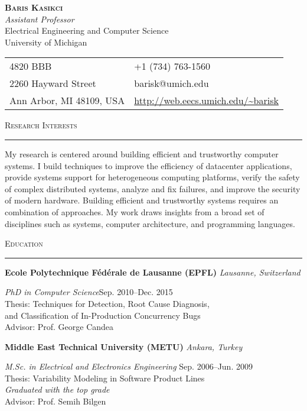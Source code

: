\documentclass[10pt]{article}
\newcommand{\mysec}[1]{\vspace{2em}\textsc{\large #1}\vspace{1mm}\hrule\vspace{2mm}}
\newcommand{\mysub}[3]{\textbf{#1} {#2} \hfill {\em #3}}
\newcommand{\myssub}[1]{\hspace*{2mm}\parbox{163mm}{#1}\vspace*{2mm}}
\begin{document}
\begin{center}
{\Large \textbf{\textsc{Baris Kasikci}}} \vspace{1mm} \\
{\em  Assistant Professor} \\
Electrical Engineering and Computer Science \\
University of Michigan
\end{center}

\vspace{1em}

\hspace{0.8in}
\begin{tabular}{@{}p{2.5in}p{4in}}
4820 BBB & +1 (734) 763-1560\\
2260 Hayward Street & barisk@umich.edu \\
Ann Arbor, MI 48109, USA & \url{http://web.eecs.umich.edu/~barisk} \\
\end{tabular}

\vspace{1em}

\mysec{Research Interests}

My research is centered around building efficient and trustworthy computer systems. I build techniques to improve the efficiency of datacenter applications, provide systems support for heterogeneous computing platforms, verify the safety of complex distributed systems, analyze and fix failures, and improve the security of modern hardware. Building efficient and trustworthy systems requires an combination of approaches. My work draws insights from a broad set of disciplines such as systems, computer architecture, and programming languages.

\mysec{Education}

\mysub{Ecole Polytechnique F\'ed\'erale de Lausanne (EPFL)}{}{Lausanne, Switzerland} \vspace*{1mm} \\
\myssub{\vspace{2mm}\textit{PhD in Computer Science}\hfill Sep. 2010--Dec. 2015 \\
Thesis: Techniques for Detection, Root Cause Diagnosis, \\ \phantom{xxxxxx} and Classification of In-Production Concurrency Bugs \\
Advisor: Prof. George Candea} \vspace{1mm}

\mysub{Middle East Technical University (METU)}{}{Ankara, Turkey} \vspace*{1mm} \\
\myssub{\vspace{2mm}\textit{M.Sc. in Electrical and Electronics Engineering} \hfill Sep. 2006--Jun. 2009 \\
Thesis:  Variability Modeling in Software Product Lines \\
{\textit{Graduated with the top grade}} \\
Advisor: Prof. Semih Bilgen} \vspace*{1mm}
\end{document}
